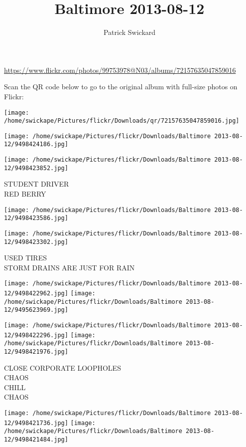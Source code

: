 \documentclass[10pt,letterpaper]{article}
\title{Baltimore 2013-08-12}
\author{Patrick Swickard}
\date{}
\begin{document}
\maketitle

\url{https://www.flickr.com/photos/99753978@N03/albums/72157635047859016}

Scan the QR code below to go to the original album with full-size photos on Flickr:

\texttt{[image: /home/swickape/Pictures/flickr/Downloads/qr/72157635047859016.jpg]}
\pagebreak

\texttt{[image: /home/swickape/Pictures/flickr/Downloads/Baltimore 2013-08-12/9498424186.jpg]}

\vspace{0.25in}
\texttt{[image: /home/swickape/Pictures/flickr/Downloads/Baltimore 2013-08-12/9498423852.jpg]}

STUDENT DRIVER\\
RED BERRY
\pagebreak

\texttt{[image: /home/swickape/Pictures/flickr/Downloads/Baltimore 2013-08-12/9498423586.jpg]}

\vspace{0.25in}
\texttt{[image: /home/swickape/Pictures/flickr/Downloads/Baltimore 2013-08-12/9498423302.jpg]}

USED TIRES\\
STORM DRAINS ARE JUST FOR RAIN
\pagebreak

\texttt{[image: /home/swickape/Pictures/flickr/Downloads/Baltimore 2013-08-12/9498422962.jpg]}
\texttt{[image: /home/swickape/Pictures/flickr/Downloads/Baltimore 2013-08-12/9495623969.jpg]}

\texttt{[image: /home/swickape/Pictures/flickr/Downloads/Baltimore 2013-08-12/9498422296.jpg]}
\texttt{[image: /home/swickape/Pictures/flickr/Downloads/Baltimore 2013-08-12/9498421976.jpg]}

CLOSE CORPORATE LOOPHOLES\\
CHAOS\\
CHILL\\
CHAOS
\pagebreak

\texttt{[image: /home/swickape/Pictures/flickr/Downloads/Baltimore 2013-08-12/9498421736.jpg]}
\texttt{[image: /home/swickape/Pictures/flickr/Downloads/Baltimore 2013-08-12/9498421484.jpg]}
\end{document}
